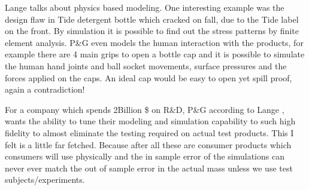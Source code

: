 \documentclass[a4paper,12 pt]{article}
\begin{document}
Lange talks about physics based modeling. One interesting example was the design flaw in Tide detergent bottle which cracked on fall, due to the Tide label on the front. By simulation it is possible to find out the stress patterns by finite element analysis. P\&G even models the human interaction with the products, for example there are 4 main grips to open a bottle cap and it is possible to simulate the human hand joints and ball socket movements, surface pressures and the forces applied on the caps. An ideal cap would be easy to open yet spill proof, again a contradiction!

For a company which spends 2Billion \$ on R\&D, P\&G according to Lange , wants the ability to tune their modeling and simulation capability to such high fidelity to almost eliminate the testing required on actual test products. This I felt is a little far fetched. Because after all these are  consumer products which consumers will use physically and the in sample error of the simulations can never ever match the out of sample error in the actual mass unless we use test subjects/experiments.
\end{document}
